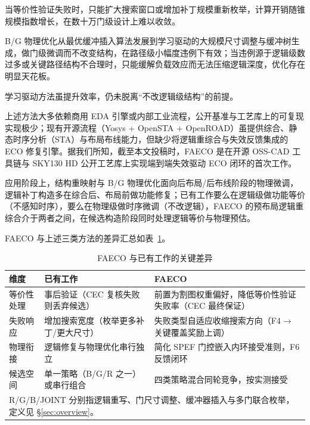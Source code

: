 \documentclass[journal]{IEEEtran}
\begin{document}
当等价性验证失败时，只能扩大搜索窗口或增加补丁规模重新枚举\cite{zhuo2018patch}，计算开销随锥规模指数增长，在数十万门级设计上难以收敛。

B/G 物理优化从最优缓冲插入算法\cite{liang2012buffer}发展到学习驱动的大规模尺寸调整与缓冲树生成\cite{liu2021rlsizer,huang2025phys,chen2024aito,zhang2025buffalo}，做门级微调而不改变结构，在路径级小幅度违例下有效；当违例源于逻辑级数过多或关键路径结构不合理时，只能缓解负载效应而无法压缩逻辑深度，优化存在明显天花板\cite{liu2021rlsizer,huang2025phys}。

学习驱动方法\cite{chen2024aito,zhang2025buffalo}虽提升效率，仍未脱离“不改逻辑级结构”的前提。

上述方法大多依赖商用 EDA 引擎或内部工业流程，公开基准与工艺库上的可复现实现极少；现有开源流程（Yosys + OpenSTA + OpenROAD）虽提供综合、静态时序分析（STA）与布局布线能力，但缺少将逻辑重综合与失效反馈集成的 ECO 修复引擎。据我们所知，截至本文投稿时，FAECO 是在开源 OSS-CAD 工具链与 SKY130 HD 公开工艺库上实现端到端失效驱动 ECO 闭环的首次工作。

应用阶段上，结构重映射与 B/G 物理优化面向后布局/后布线阶段的物理微调，逻辑补丁构造多在综合后、布局前做功能修复；已有工作要么在逻辑级做功能等价（不感知时序），要么在物理级做时序微调（不改逻辑），FAECO 的预布局逻辑重综合介于两者之间，在候选构造阶段同时处理逻辑等价与物理预估。

FAECO 与上述三类方法的差异汇总如表~\ref{tab:related_diff}。

\begin{table}[!t]
\centering
\caption{FAECO 与已有工作的关键差异}
\label{tab:related_diff}
\footnotesize
\setlength{\tabcolsep}{3pt}
\begin{tabular}{p{2.2cm}p{2.8cm}p{3.2cm}}
\toprule
\textbf{维度} & \textbf{已有工作} & \textbf{FAECO} \\
\midrule
等价性处理 & 事后验证（CEC 复核失败则丢弃候选） & 前置为割图权重偏好，降低等价性验证失败率（CEC 最终保证） \\
失败响应 & 增加搜索宽度（枚举更多补丁/更大尺寸） & 失败类型自适应收缩搜索方向（F4$\to$关键覆盖奖励上调） \\
物理衔接 & 逻辑修复与物理优化串行独立 & 简化 SPEF 门控嵌入内环接受准则，F6 反馈闭环 \\
候选空间 & 单一策略（B/G/R 之一）或串行组合 & 四类策略混合同轮竞争，按实测接受 \\
\bottomrule
\multicolumn{3}{p{8.0cm}}{\footnotesize R/G/B/JOINT 分别指逻辑重写、门尺寸调整、缓冲器插入与多门联合枚举，定义见 \S\ref{sec:overview}。}\\
\end{tabular}
\end{table}
\end{document}
